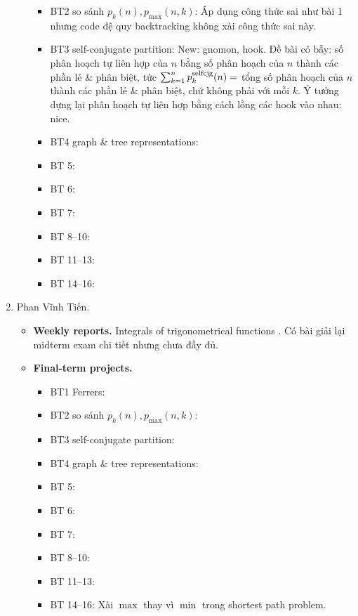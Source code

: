 \documentclass{article}
\begin{document}
\begin{enumerate}
\begin{itemize}
\begin{itemize}
            \item BT2 so sánh $p_k(n),p_{\max}(n,k)$: Áp dụng công thức sai như bài 1 nhưng code đệ quy backtracking không xài công thức sai này.
            \item BT3 self-conjugate partition: New: gnomon, hook. Đề bài có bẫy: số phân hoạch tự liên hợp của $n$ bằng số phân hoạch của $n$ thành các phần lẻ \& phân biệt, tức $\sum_{k=1}^n p_k^{\rm selfcjg}(n) =$ tổng số phân hoạch của $n$ thành các phần lẻ \& phân biệt, chứ không phải với mỗi $k$. Ý tưởng dựng lại phân hoạch tự liên hợp bằng cách lồng các hook vào nhau: nice.
            \item BT4 graph \& tree representations:
            \item BT 5:
            \item BT 6:
            \item BT 7:
            \item BT 8--10:
            \item BT 11--13:
            \item BT 14--16:
        \end{itemize}
    \end{itemize}
    \item {\sc Phan Vĩnh Tiến.}
    \begin{itemize}
        \item {\bf Weekly reports.} Integrals of trigonometrical functions . Có bài giải lại midterm exam chi tiết nhưng chưa đầy đủ.
        \item {\bf Final-term projects.}
        \begin{itemize}
            \item BT1 Ferrers:
            \item BT2 so sánh $p_k(n),p_{\max}(n,k)$:
            \item BT3 self-conjugate partition:
            \item BT4 graph \& tree representations:
            \item BT 5:
            \item BT 6:
            \item BT 7:
            \item BT 8--10:
            \item BT 11--13:
            \item BT 14--16: Xài $\max$ thay vì $\min$ trong shortest path problem.
        \end{itemize}
    \end{itemize}
\end{enumerate}
\end{document}

